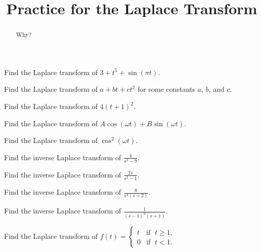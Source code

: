 \documentclass{ximera}
\title{Practice for the Laplace Transform}
\begin{document}
\begin{abstract}
Why?
\end{abstract}
\maketitle


\begin{exercise}
    Find the Laplace transform of $3+t^5+\sin (\pi t)$.
\end{exercise}

\begin{exercise}
    Find the Laplace transform of $a+bt+ct^2$ for some constants $a$, $b$, and $c$.
\end{exercise}

\begin{exercise}
    Find the Laplace transform of $4{(t+1)}^2$. \\
\end{exercise}

\begin{exercise}
    Find the Laplace transform of $A \cos (\omega t) + B \sin (\omega t)$.
\end{exercise}

\begin{exercise}
    Find the Laplace transform of $\cos^2 (\omega t)$.
\end{exercise}

\begin{exercise}
    Find the inverse Laplace transform of $\frac{4}{s^2-9}$.
\end{exercise}

\begin{exercise}
    Find the inverse Laplace transform of $\frac{2s}{s^2-1}$.
\end{exercise}

\begin{exercise}%
    Find the inverse Laplace transform of $\frac{8}{s^3(s+2)}$.
\end{exercise}

\begin{exercise}
    Find the inverse Laplace transform of $\frac{1}{{(s-1)}^2(s+1)}$.
\end{exercise}

\begin{exercise}
    Find the Laplace transform of $f(t) =
    \begin{cases}
        t & \text{if } \; t \geq 1, \\
        0 & \text{if } \; t < 1.
    \end{cases}$
\end{exercise}
\end{document}
